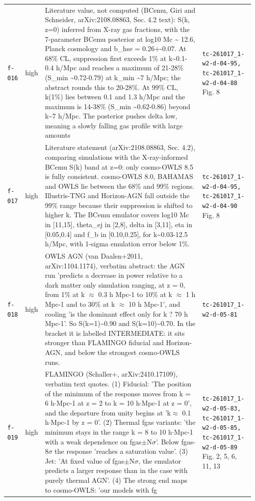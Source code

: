 \documentclass[11pt,a4paper]{article}
\begin{document}
\begin{longtable}{@{}p{}p{}p{}p{}@{}}
\texttt{f-016} & high & Literature value, not computed (BCemu, Giri and Schneider, arXiv:2108.08863, Sec. 4.2 text): S(k, z=0) inferred from X-ray gas fractions, with the 7-parameter BCemu posterior at log10 Mc \textasciitilde{} 12.6, Planck cosmology and b\_hse = 0.26+-0.07. At 68\% CL, suppression first exceeds 1\% at k\textasciitilde{}0.1-0.4 h/Mpc and reaches a maximum of 21-28\% (S\_min \textasciitilde{}0.72-0.79) at k\_min \textasciitilde{}7 h/Mpc; the abstract rounds this to 20-28\%. At 99\% CL, k(1\%) lies between 0.1 and 1.3 h/Mpc and the maximum is 14-38\% (S\_min \textasciitilde{}0.62-0.86) beyond k\textasciitilde{}7 h/Mpc. The posterior pushes delta low, meaning a slowly falling gas profile with large amounts  & \texttt{tc-261017\_\allowbreak{}1-w2-d-04-95,\allowbreak{} tc-261017\_\allowbreak{}1-w2-d-04-88} Fig. 8 \\
\texttt{f-017} & high & Literature statement (arXiv:2108.08863, Sec. 4.2), comparing simulations with the X-ray-informed BCemu S(k) band at z=0: only cosmo-OWLS 8.5 is fully consistent. cosmo-OWLS 8.0, BAHAMAS and OWLS lie between the 68\% and 99\% regions. Illustris-TNG and Horizon-AGN fall outside the 99\% range because their suppression is shifted to higher k. The BCemu emulator covers log10 Mc in [11,15], theta\_ej in [2,8], delta in [3,11], eta in [0.05,0.4] and f\_b in [0.10,0.25], for k\textasciitilde{}0.03-12.5 h/Mpc, with 1-sigma emulation error below 1\%. & \texttt{tc-261017\_\allowbreak{}1-w2-d-04-95,\allowbreak{} tc-261017\_\allowbreak{}1-w2-d-04-90} Fig. 8 \\
\texttt{f-018} & high & OWLS AGN (van Daalen+2011, arXiv:1104.1174), verbatim abstract: the AGN run 'predicts a decrease in power relative to a dark matter only simulation ranging, at z = 0, from 1\% at k $\approx$ 0.3 h Mpc-1 to 10\% at k $\approx$ 1 h Mpc-1 and to 30\% at k $\approx$ 10 h Mpc-1', and cooling 'is the dominant effect only for k ? 70 h Mpc-1'. So S(k=1)\textasciitilde{}0.90 and S(k=10)\textasciitilde{}0.70. In the bracket it is labelled INTERMEDIATE: it sits stronger than FLAMINGO fiducial and Horizon-AGN, and below the strongest cosmo-OWLS runs. & \texttt{tc-261017\_\allowbreak{}1-w2-d-05-81} \\
\texttt{f-019} & high & FLAMINGO (Schaller+, arXiv:2410.17109), verbatim text quotes. (1) Fiducial: 'The position of the minimum of the response moves from k = 6 h$\cdot$Mpc-1 at z = 2 to k = 10 h$\cdot$Mpc-1 at z = 0', and the departure from unity begins at 'k$\approx$ 0.1 h$\cdot$Mpc-1 by z = 0'. (2) Thermal fgas variants: 'the minimum stays in the range k = 8 to 10 h$\cdot$Mpc-1 with a weak dependence on fgas$\pm$N$\sigma$'. Below fgas-8$\sigma$ the response 'reaches a saturation value'. (3) Jet: 'At fixed value of fgas$\pm$N$\sigma$, the emulator predicts a larger response than in the case with purely thermal AGN'. (4) The strong end maps to cosmo-OWLS: 'our models with fg & \texttt{tc-261017\_\allowbreak{}1-w2-d-05-83,\allowbreak{} tc-261017\_\allowbreak{}1-w2-d-05-85,\allowbreak{} tc-261017\_\allowbreak{}1-w2-d-05-89} Fig. 2, 5, 6, 11, 13 \\

\end{longtable}
\end{document}
